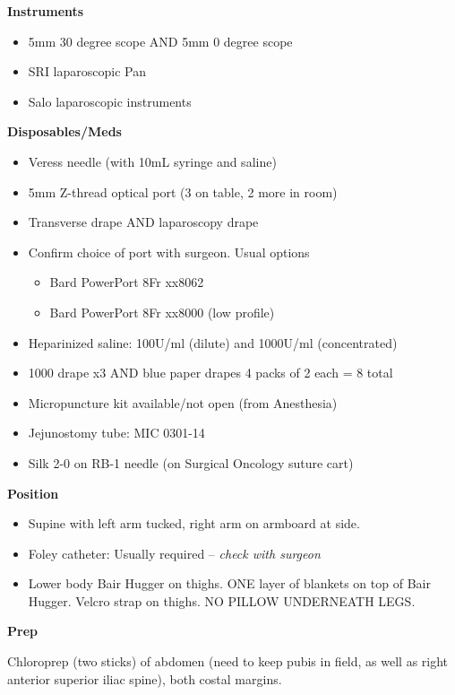 \documentclass[
]{book}
\providecommand{\tightlist}{%
  \setlength{\itemsep}{0pt}\setlength{\parskip}{0pt}}
\begin{document}
\textbf{Instruments}

\begin{itemize}
\tightlist
\item
  5mm 30 degree scope AND 5mm 0 degree scope
\item
  SRI laparoscopic Pan
\item
  Salo laparoscopic instruments
\end{itemize}

\textbf{Disposables/Meds}

\begin{itemize}
\tightlist
\item
  Veress needle (with 10mL syringe and saline)
\item
  5mm Z-thread optical port (3 on table, 2 more in room)
\item
  Transverse drape AND laparoscopy drape
\item
  Confirm choice of port with surgeon. Usual options

  \begin{itemize}
  \tightlist
  \item
    Bard PowerPort 8Fr xx8062
  \item
    Bard PowerPort 8Fr xx8000 (low profile)
  \end{itemize}
\item
  Heparinized saline: 100U/ml (dilute) and 1000U/ml (concentrated)
\item
  1000 drape x3 AND blue paper drapes 4 packs of 2 each = 8 total
\item
  Micropuncture kit available/not open (from Anesthesia)
\item
  Jejunostomy tube: MIC 0301-14
\item
  Silk 2-0 on RB-1 needle (on Surgical Oncology suture cart)
\end{itemize}

\textbf{Position}

\begin{itemize}
\tightlist
\item
  Supine with left arm tucked, right arm on armboard at side.
\item
  Foley catheter: Usually required -- \emph{check with surgeon}
\item
  Lower body Bair Hugger on thighs. ONE layer of blankets on top of Bair Hugger. Velcro strap on thighs. NO PILLOW UNDERNEATH LEGS.
\end{itemize}

\textbf{Prep}

Chloroprep (two sticks) of abdomen (need to keep pubis in field, as well as right anterior superior iliac spine), both costal margins.
\end{document}
